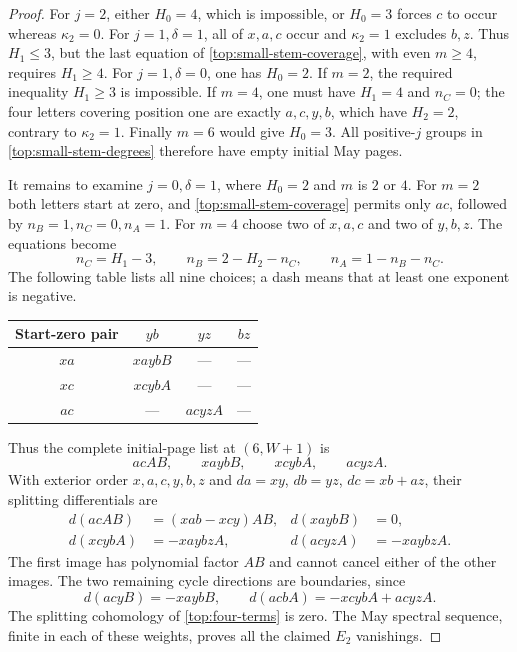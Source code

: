 \begin{proof}
For $j=2$, either $H_0=4$, which is impossible, or $H_0=3$ forces
$c$ to occur whereas $\kappa_2=0$. For $j=1,\delta=1$, all of $x,a,c$
occur and $\kappa_2=1$ excludes $b,z$. Thus $H_1\leq3$, but the last
equation of \eqref{top:small-stem-coverage}, with even $m\geq4$,
requires $H_1\geq4$. For $j=1,\delta=0$, one has $H_0=2$.
If $m=2$, the required inequality $H_1\geq3$ is impossible.
If $m=4$, one must have $H_1=4$ and $n_C=0$; the four letters
covering position one are exactly $a,c,y,b$, which have $H_2=2$,
contrary to $\kappa_2=1$. Finally $m=6$ would give $H_0=3$.
All positive-$j$ groups in \eqref{top:small-stem-degrees} therefore
have empty initial May pages.

It remains to examine $j=0,\delta=1$, where $H_0=2$ and $m$ is
$2$ or $4$. For $m=2$ both letters start at zero, and
\eqref{top:small-stem-coverage} permits only $ac$, followed by
$n_B=1,n_C=0,n_A=1$. For $m=4$ choose two of $x,a,c$ and two of
$y,b,z$. The equations become
\[
 n_C=H_1-3,\qquad n_B=2-H_2-n_C,\qquad
 n_A=1-n_B-n_C.
\]
The following table lists all nine choices; a dash means that at
least one exponent is negative.
\begin{center}
\begin{tabular}{c c c c}
\toprule
Start-zero pair & $yb$ & $yz$ & $bz$\\
\midrule
$xa$ & $xaybB$ & --- & ---\\
$xc$ & $xcybA$ & --- & ---\\
$ac$ & --- & $acyzA$ & ---\\
\bottomrule
\end{tabular}
\end{center}
Thus the complete initial-page list at $(6,W+1)$ is
\begin{equation}
\label{top:four-terms}
 acAB,\qquad xaybB,\qquad xcybA,\qquad acyzA.
\end{equation}
With exterior order $x,a,c,y,b,z$ and
$da=xy$, $db=yz$, $dc=xb+az$, their splitting differentials are
\[
\begin{aligned}
 d(acAB)&=(xab-xcy)AB, &d(xaybB)&=0,\\
 d(xcybA)&=-xaybzA, &d(acyzA)&=-xaybzA.
\end{aligned}
\]
The first image has polynomial factor $AB$ and cannot cancel either
of the other images. The two remaining cycle directions are
boundaries, since
\[
 d(acyB)=-xaybB,\qquad
 d(acbA)=-xcybA+acyzA.
\]
The splitting cohomology of \eqref{top:four-terms} is zero.
The May spectral sequence, finite in each of these weights, proves
all the claimed $E_2$ vanishings.


\end{proof}
